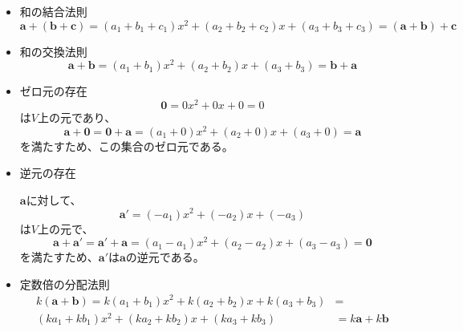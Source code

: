 \begin{itemize}
	\item 和の結合法則
	      \begin{equation}
		      \boldsymbol{a}+(\boldsymbol{b}+\boldsymbol{c})=
		      (a_1+b_1+c_1) x^2+(a_2+b_2+c_2) x+(a_3+b_3+c_3)=
		      (\boldsymbol{a}+\boldsymbol{b})+\boldsymbol{c}
	      \end{equation}

	\item 和の交換法則
	      \begin{equation}
		      \boldsymbol{a}+\boldsymbol{b}=
		      (a_1+b_1) x^2+(a_2+b_2) x+(a_3+b_3)=
		      \boldsymbol{b}+\boldsymbol{a}
	      \end{equation}

	\item ゼロ元の存在
	      \begin{equation}
		      \boldsymbol{0}=0 x^2+0 x+0=0
	      \end{equation}
	      は\(V\)上の元であり、
	      \begin{equation}
		      \boldsymbol{a}+\boldsymbol{0}=
		      \boldsymbol{0}+\boldsymbol{a}=
		      (a_1+0) x^2+(a_2+0) x+(a_3+0)=
		      \boldsymbol{a}
	      \end{equation}
	      を満たすため、この集合のゼロ元である。

	\item 逆元の存在

	      \(\boldsymbol{a}\)に対して、
	      \begin{equation}
		      \boldsymbol{a}'=(-a_1) x^2+(-a_2) x+(-a_3)
	      \end{equation}
	      は\(V\)上の元で、
	      \begin{equation}
		      \boldsymbol{a}+\boldsymbol{a}'=
		      \boldsymbol{a}'+\boldsymbol{a}=
		      (a_1-a_1) x^2+(a_2-a_2) x+(a_3-a_3)=
		      \boldsymbol{0}
	      \end{equation}
	      を満たすため、\(\boldsymbol{a}'\)は\(\boldsymbol{a}\)の逆元である。

	\item 定数倍の分配法則
	      \begin{equation}
		      \begin{split}
			      k(\boldsymbol{a}+\boldsymbol{b})=
			      k(a_1+b_1) x^2+k(a_2+b_2) x+k(a_3+b_3) &= \\
			      (ka_1+kb_1) x^2+(ka_2+kb_2) x+(ka_3+kb_3) &=
			      k\boldsymbol{a}+k\boldsymbol{b}
		      \end{split}
	      \end{equation}


\end{itemize}
